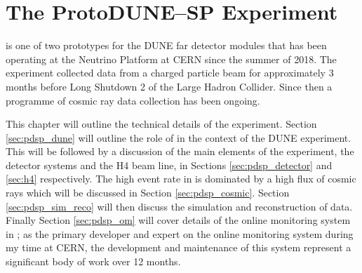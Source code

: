 \chapter{\label{ch:3-protodune}The ProtoDUNE--SP Experiment} 

\minitoc

%
% 


\protodune{} is one of two prototypes for the DUNE far detector modules that has
been operating at the Neutrino Platform at CERN since the summer of 2018. The
experiment collected data from a charged particle beam for approximately 3 
months before Long Shutdown 2 of the Large Hadron Collider. Since then a 
programme of cosmic ray data collection has been ongoing.

This chapter will outline the technical details of the \protodune{} experiment.
Section \ref{sec:pdsp_dune} will outline the role of \protodune{} in the context
of the DUNE experiment. This will be followed by a discussion of the main
elements of the experiment, the \protodune{} detector systems and the H4
beam line, in Sections \ref{sec:pdsp_detector} and \ref{sec:h4} respectively.
The high event rate in \protodune{} is dominated by a high flux of cosmic rays
which will be discussed in Section \ref{sec:pdsp_cosmic}. Section
\ref{sec:pdsp_sim_reco} will then discuss the simulation and reconstruction of 
\protodune{} data. Finally Section \ref{sec:pdsp_om} will cover details of the 
online monitoring system in \protodune{}; as the primary developer and expert 
on the \protodune{} online monitoring system during my time at CERN, the 
development and maintenance of this system represent a significant body of 
work over 12 months.  

